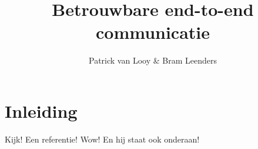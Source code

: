 \documentclass[a4paper,10pt]{article}
\title{Betrouwbare end-to-end communicatie}
\author{Patrick van Looy \& Bram Leenders}
\begin{document}
\maketitle

\section{Inleiding}
Kijk! Een referentie! \cite{sundararaman2005clock} Wow! En hij staat ook onderaan!


% 



\end{document}
